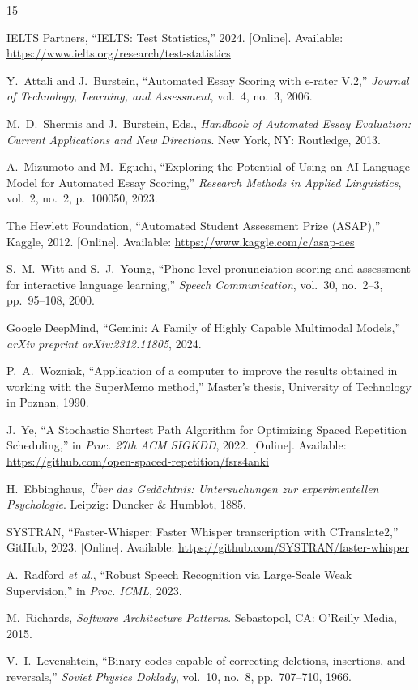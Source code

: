 \documentclass[conference]{IEEEtran}
\begin{document}
\begin{thebibliography}{15}

IELTS Partners, ``IELTS: Test Statistics,'' 2024. [Online]. Available: \url{https://www.ielts.org/research/test-statistics}

Y.~Attali and J.~Burstein, ``Automated Essay Scoring with e-rater V.2,'' \textit{Journal of Technology, Learning, and Assessment}, vol.~4, no.~3, 2006.

M.~D.~Shermis and J.~Burstein, Eds., \textit{Handbook of Automated Essay Evaluation: Current Applications and New Directions}. New York, NY: Routledge, 2013.

A.~Mizumoto and M.~Eguchi, ``Exploring the Potential of Using an AI Language Model for Automated Essay Scoring,'' \textit{Research Methods in Applied Linguistics}, vol.~2, no.~2, p.~100050, 2023.

The Hewlett Foundation, ``Automated Student Assessment Prize (ASAP),'' Kaggle, 2012. [Online]. Available: \url{https://www.kaggle.com/c/asap-aes}

S.~M.~Witt and S.~J.~Young, ``Phone-level pronunciation scoring and assessment for interactive language learning,'' \textit{Speech Communication}, vol.~30, no.~2--3, pp.~95--108, 2000.

Google DeepMind, ``Gemini: A Family of Highly Capable Multimodal Models,'' \textit{arXiv preprint arXiv:2312.11805}, 2024.

P.~A.~Wozniak, ``Application of a computer to improve the results obtained in working with the SuperMemo method,'' Master's thesis, University of Technology in Poznan, 1990.

J.~Ye, ``A Stochastic Shortest Path Algorithm for Optimizing Spaced Repetition Scheduling,'' in \textit{Proc. 27th ACM SIGKDD}, 2022. [Online]. Available: \url{https://github.com/open-spaced-repetition/fsrs4anki}

H.~Ebbinghaus, \textit{{\"U}ber das Ged{\"a}chtnis: Untersuchungen zur experimentellen Psychologie}. Leipzig: Duncker \& Humblot, 1885.

SYSTRAN, ``Faster-Whisper: Faster Whisper transcription with CTranslate2,'' GitHub, 2023. [Online]. Available: \url{https://github.com/SYSTRAN/faster-whisper}

A.~Radford \textit{et al.}, ``Robust Speech Recognition via Large-Scale Weak Supervision,'' in \textit{Proc. ICML}, 2023.

M.~Richards, \textit{Software Architecture Patterns}. Sebastopol, CA: O'Reilly Media, 2015.

V.~I.~Levenshtein, ``Binary codes capable of correcting deletions, insertions, and reversals,'' \textit{Soviet Physics Doklady}, vol.~10, no.~8, pp.~707--710, 1966.

\end{thebibliography}
\end{document}
